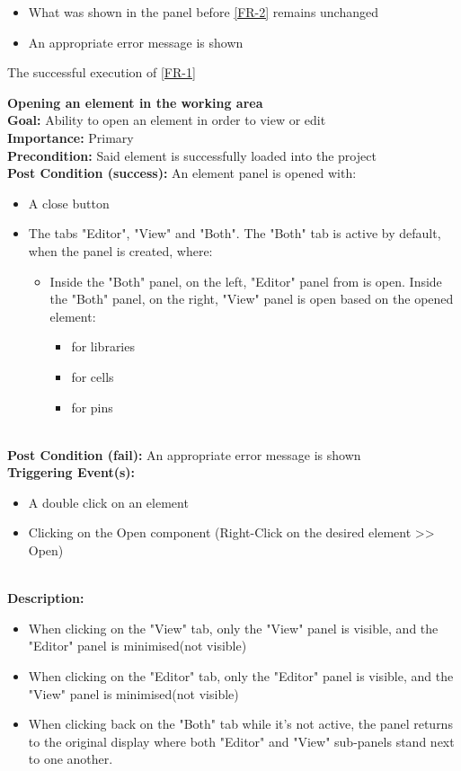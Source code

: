 \documentclass[10pt,a4paper]{report}
\newcommand{\precondition}[1]{
    \textbf{Precondition: } #1 \leavevmode \\
}
\newcommand{\FRDescription}[8]{
    \textbf{#1} \leavevmode \\
    \textbf{Goal: } #2 \leavevmode \\
    \textbf{Importance: } #3 \leavevmode \\
    \precondition{#4}
    \textbf{Post Condition (success): } #5 \leavevmode \\
    \textbf{Post Condition (fail): } #6 \leavevmode \\
    \textbf{Triggering Event(s): } #7 \leavevmode \\
    \textbf{Description: } \leavevmode \\ 
    #8}
\begin{document}
\begin{FR}
{\begin{itemize}
        \item What was shown in the panel before \ref{FR-2} remains unchanged
        \item An appropriate error message is shown
    \end{itemize}}
    {The successful execution of \ref{FR-1}}
    \item \FRDescription{Opening an element in the working area}
    {Ability to open an element in order to view or edit}
    {Primary}
    {Said element is successfully loaded into the project}
    {An element panel is opened with:
    \begin{itemize}
        \item A close button 
        \item The tabs "Editor", "View" and "Both". The "Both" tab is active by default, when the panel is created, where:
        \begin{itemize}
            \item Inside the "Both" panel, on the left, "Editor" panel from \label{FR-PLACEHOLDER} is open. %
            Inside the "Both" panel, on the right, "View" panel is open based on the opened element:
            \begin{itemize}
                \item \label{FR-grca} for libraries
                \item \label{FR-grca} for cells
                \item \label{FR-grca} for pins 
            \end{itemize}
        \end{itemize}
    \end{itemize}}
    {An appropriate error message is shown}
    {\begin{itemize}
        \item A double click on an element
        \item Clicking on the Open component (Right-Click on the desired element >> Open)
    \end{itemize}}
    {\begin{itemize}
        \item When clicking on the "View" tab, only the "View" panel is visible, and the "Editor" panel is minimised(not visible)
        \item When clicking on the "Editor" tab, only the "Editor" panel is visible, and the "View" panel is minimised(not visible)
        \item When clicking back on the "Both" tab while it's not active, the panel returns to the original display where both "Editor" and "View" sub-panels stand next to one another.

\end{itemize}}
\end{FR}
\end{document}
